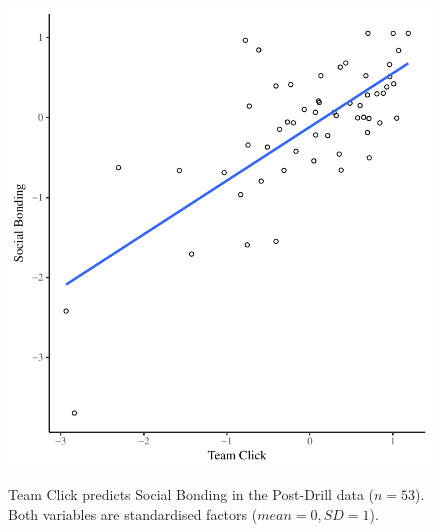 \begin{CJK}{UTF8}{gbsn}
\begin{figure}
  \centering
    \includegraphics[width=0.5\linewidth,keepaspectratio] {images/groupClickBondScatter}
    \label{fig:groupClickBondScatter}
    \caption{Team Click predicts Social Bonding in the Post-Drill data ($n = 53$).  Both variables are standardised factors ($mean = 0, SD = 1$).}
\end{figure}





\end{CJK}
